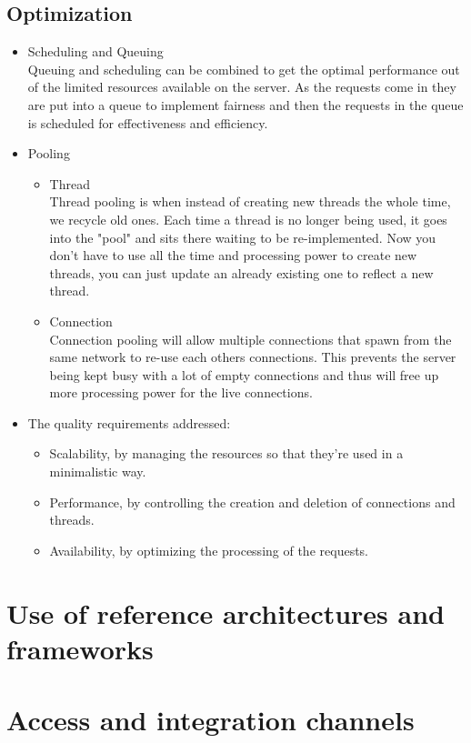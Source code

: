\documentclass[12pt, oneside]{article}
\begin{document}
	\subsection{Optimization}
		\begin{itemize}
			\item Scheduling and Queuing\\
			Queuing and scheduling can be combined to get the optimal performance out of the limited resources available on the server. As the requests come in they are put into a queue to implement fairness and then the requests in the queue is scheduled for effectiveness and efficiency.
			\item Pooling\\
				\begin{itemize}
					\item Thread\\
					Thread pooling is when instead of creating new threads the whole time, we recycle old ones. Each time a thread is no longer being used, it goes into the "pool" and sits there waiting to be re-implemented. Now you don't have to use all the time and processing power to create new threads, you can just update an already existing one to reflect a new thread.
					\item Connection\\
					Connection pooling will allow multiple connections that spawn from the same network to re-use each others connections. This prevents the server being kept busy with a lot of empty connections and thus will free up more processing power for the live connections.
				\end{itemize}
			\item The quality requirements addressed:
			\begin{itemize}
				\item Scalability, by managing the resources so that they're used in a minimalistic way.
				\item Performance, by controlling the creation and deletion of connections and threads.
				\item Availability, by optimizing the processing of the requests.
			\end{itemize}
		\end{itemize}

\section{Use of reference architectures and frameworks}
\newpage
\section{Access and integration channels}
\end{document}
